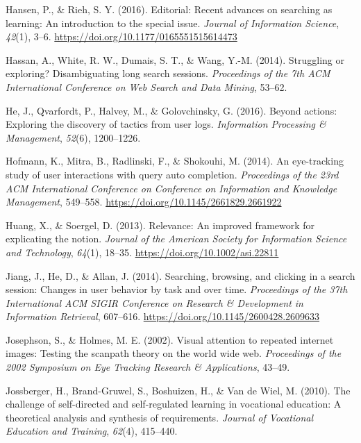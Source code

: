 \documentclass[letterpaper, nobind]{templates/ociamthesis}
\newlength{\cslhangindent}
\newenvironment{CSLReferences}[2] %
 {%
  \setlength{\parindent}{0pt}
  \ifodd #1
  \let\oldpar\par
  \def\par{\hangindent=\cslhangindent\oldpar}
  \fi
  \setlength{\parskip}{1mm}
  \setlength{\baselineskip}{6mm}
 }%
 {}
\begin{document}
\begin{CSLReferences}{1}{0}
\leavevmode{}%
Hansen, P., \& Rieh, S. Y. (2016). Editorial: Recent advances on searching as learning: An introduction to the special issue. \emph{Journal of Information Science}, \emph{42}(1), 3--6. \url{https://doi.org/10.1177/0165551515614473}

\leavevmode{}%
Hassan, A., White, R. W., Dumais, S. T., \& Wang, Y.-M. (2014). Struggling or exploring? Disambiguating long search sessions. \emph{Proceedings of the 7th ACM International Conference on Web Search and Data Mining}, 53--62.

\leavevmode{}%
He, J., Qvarfordt, P., Halvey, M., \& Golovchinsky, G. (2016). Beyond actions: Exploring the discovery of tactics from user logs. \emph{Information Processing \& Management}, \emph{52}(6), 1200--1226.

\leavevmode{}%
Hofmann, K., Mitra, B., Radlinski, F., \& Shokouhi, M. (2014). An eye-tracking study of user interactions with query auto completion. \emph{Proceedings of the 23rd {ACM} International Conference on Conference on Information and Knowledge Management}, 549--558. \url{https://doi.org/10.1145/2661829.2661922}

\leavevmode{}%
Huang, X., \& Soergel, D. (2013). Relevance: {An} improved framework for explicating the notion. \emph{Journal of the American Society for Information Science and Technology}, \emph{64}(1), 18--35. \url{https://doi.org/10.1002/asi.22811}

\leavevmode{}%
Jiang, J., He, D., \& Allan, J. (2014). Searching, browsing, and clicking in a search session: {Changes} in user behavior by task and over time. \emph{Proceedings of the 37th International {ACM SIGIR} Conference on Research \& Development in Information Retrieval}, 607--616. \url{https://doi.org/10.1145/2600428.2609633}

\leavevmode{}%
Josephson, S., \& Holmes, M. E. (2002). Visual attention to repeated internet images: Testing the scanpath theory on the world wide web. \emph{Proceedings of the 2002 Symposium on Eye Tracking Research \& Applications}, 43--49.

\leavevmode{}%
Jossberger, H., Brand-Gruwel, S., Boshuizen, H., \& Van de Wiel, M. (2010). The challenge of self-directed and self-regulated learning in vocational education: A theoretical analysis and synthesis of requirements. \emph{Journal of Vocational Education and Training}, \emph{62}(4), 415--440.


\end{CSLReferences}
\end{document}
